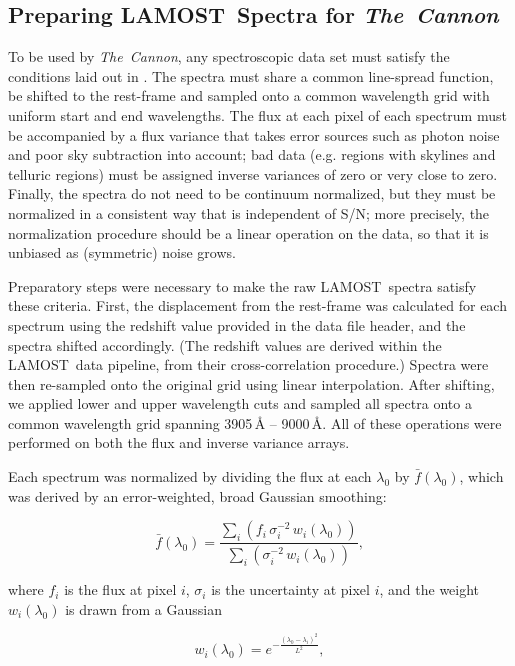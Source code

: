 \documentclass[12pt, letterpaper, preprint]{aastex}
\newcommand{\tc}{\textsl{The~Cannon}}
\newcommand{\lamost}{LAMOST}
\begin{document}
\subsection{Preparing \lamost\ Spectra for \tc} 
\label{sec:normalization}

To be used by \tc, any spectroscopic data set must satisfy the conditions laid out in \citet{Ness2015}. 
The spectra must share a common line-spread function, be shifted to the rest-frame and sampled onto a common wavelength grid with uniform start and end wavelengths.
The flux at each pixel of each spectrum must be accompanied
by a flux variance that takes error sources such as photon noise and poor sky subtraction into account; 
bad data (e.g. regions with skylines and telluric regions) must be
assigned inverse variances of zero or very close to zero.
Finally, the spectra do not need to be continuum normalized, but they must be normalized
in a consistent way that is independent of S/N; 
more precisely, the normalization procedure should be a linear operation on the data, so that it is unbiased as (symmetric) noise grows. 

Preparatory steps were necessary to make the raw \lamost\ spectra
satisfy these criteria.
First, the displacement from the rest-frame was
calculated for each spectrum using the redshift value provided in 
the data file header, and the spectra shifted accordingly.
(The redshift values are derived within the \lamost\ 
data pipeline, 
from their cross-correlation procedure.)
Spectra were then re-sampled onto the original grid using linear interpolation. 
After shifting, we applied lower and upper wavelength cuts
and sampled all spectra onto a common wavelength grid 
spanning 3905\,$\mbox{\AA}$ -- 9000\,$\mbox{\AA}$.
All of these operations were performed on both the flux and inverse variance
arrays. 

Each spectrum was normalized by dividing the flux at each $\lambda_0$ by $\bar{f} (\lambda_0)$, which was
derived by an error-weighted, broad Gaussian smoothing:

\begin{equation}
\bar{f}(\lambda_0) = \frac{\sum_i (f_i\,\sigma^{-2}_i\,w_i(\lambda_0))}{\sum_i (\sigma^{-2}_i\,w_i(\lambda_0))},
\end{equation}

\noindent where $f_i$ is the flux at pixel $i$, $\sigma_i$ is the uncertainty at pixel $i$, and the weight $w_i (\lambda_0)$ is drawn from a Gaussian 

\begin{equation}
w_i(\lambda_0) = e^{-\frac{(\lambda_0-\lambda_i)^2}{L^2}},
\end{equation}
\end{document}

